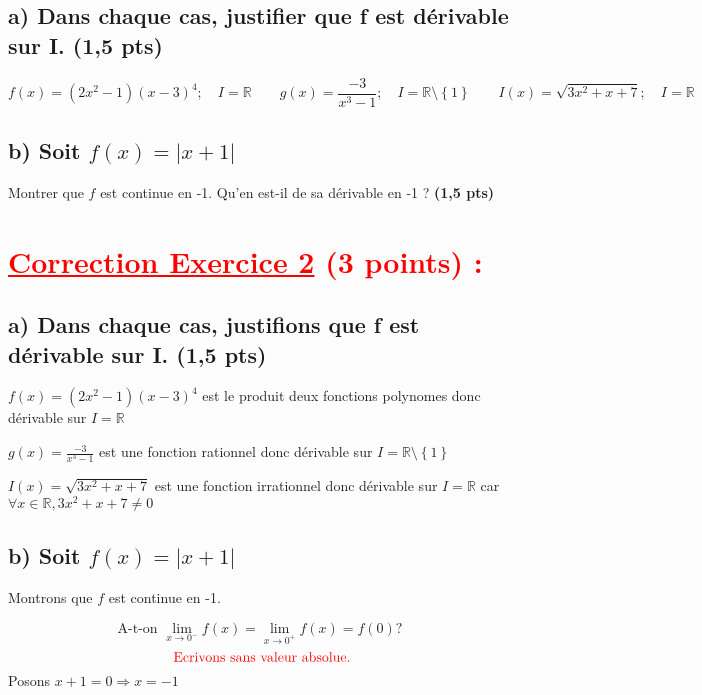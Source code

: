 \documentclass{article}
\begin{document}
\subsection*{a) Dans chaque cas, justifier que f est dérivable sur I. (1,5 pts)}
\[f(x)=(2x^{2}-1)(x-3)^{4};\quad I=\mathbb{R}\quad\quad g(x)=\frac{-3}{x^{3}-1};\quad I=\mathbb{R}\setminus\left\lbrace 1 \right\rbrace \quad\quad I(x)=\sqrt{3x^{2}+x+7};\quad I=\mathbb{R}\]
\subsection*{b) Soit $f(x)=|x+1|$ }
Montrer que $f$ est continue en -1. Qu'en est-il de sa dérivable en -1 ? \textbf{(1,5 pts)}
\section*{\textcolor{red}{\underline{Correction Exercice 2} (3 points) :}}
\subsection*{a) Dans chaque cas, justifions que f est dérivable sur I. (1,5 pts)}
$f(x)=(2x^{2}-1)(x-3)^{4}$ est le produit deux fonctions polynomes donc dérivable sur $I=\mathbb{R}$

$g(x)=\frac{-3}{x^{3}-1}$ est une fonction rationnel donc dérivable sur $I=\mathbb{R}\setminus\left\lbrace 1 \right\rbrace$

$I(x)=\sqrt{3x^{2}+x+7}$ est une fonction irrationnel donc dérivable sur $I=\mathbb{R}$ car\\ $\forall x\in \mathbb{R}, 3x^{2}+x+7\neq 0$
\subsection*{b) Soit $f(x)=|x+1|$ }
Montrons que $f$ est continue en -1.

\[\text{A-t-on }\lim_{x \to 0^{-}}f(x)=\lim_{x \to 0^{+}}f(x)=f(0)?\]
\[\textcolor{red}{\text{ Ecrivons sans valeur absolue.}}\]
Posons $x+1=0\Rightarrow x=-1$
\end{document}
